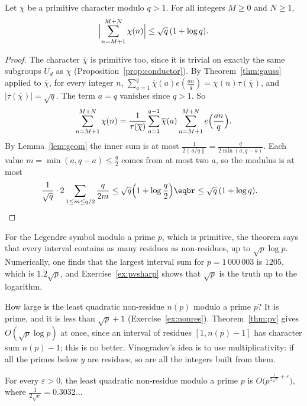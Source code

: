 \begin{theorem}\label{thm:pv}
Let $\chi$ be a primitive character modulo $q>1$. For all integers $M\ge0$ and $N\ge1$,
\[
\Bigl|\sum_{n=M+1}^{M+N}\chi(n)\Bigr|\le\sqrt q\,(1+\log q).
\]
\end{theorem}

\begin{proof}
The character $\overline\chi$ is primitive too, since it is trivial on exactly the same subgroups $U_d$ as $\chi$ (Proposition~\ref{prop:conductor}). By Theorem~\ref{thm:gauss} applied to $\overline\chi$, for every integer $n$,
$\sum_{a=1}^q\overline\chi(a)e(\frac{an}q)=\chi(n)\tau(\overline\chi)$, and $|\tau(\overline\chi)|=\sqrt q$. The term $a=q$ vanishes since $q>1$. So
\[
\sum_{n=M+1}^{M+N}\chi(n)=\frac1{\tau(\overline\chi)}\sum_{a=1}^{q-1}\overline\chi(a)\sum_{n=M+1}^{M+N}e\Bigl(\frac{an}q\Bigr).
\]
By Lemma~\ref{lem:geom} the inner sum is at most $\frac1{2\|a/q\|}=\frac q{2\min(a,q-a)}$. Each value $m=\min(a,q-a)\le\frac q2$ comes from at most two $a$, so the modulus is at most
\[
\begin{aligned}\frac1{\sqrt q}\cdot2\sum_{1\le m\le q/2}\frac q{2m}&\le\sqrt q\Bigl(1+\log\frac q2\Bigr)\eqbr\le\sqrt q\,(1+\log q).\end{aligned}
\]
\end{proof}

For the Legendre symbol modulo a prime $p$, which is primitive, the theorem says that every interval contains as many residues as non-residues, up to $\sqrt p\log p$. Numerically, one finds that the largest interval sum
for $p=1\,000\,003$ is $1205$, which is $1.2\sqrt p$, and Exercise~\ref{ex:pvsharp} shows that $\sqrt p$ is the truth up to the logarithm.

How large is the least quadratic non-residue $n(p)$ modulo a prime $p$? It is prime, and it is less than $\sqrt p+1$ (Exercise~\ref{ex:nonres}). Theorem~\ref{thm:pv} gives $O(\sqrt p\log p)$ at once, since an interval of
residues $[1,n(p)-1]$ has character sum $n(p)-1$; this is no better. Vinogradov's idea is to use multiplicativity: if all the primes below $y$ are residues, so are all the integers built from them.

\begin{theorem}[Vinogradov, 1918]\label{thm:vinogradov}
For every $\varepsilon>0$, the least quadratic non-residue modulo a prime $p$ is $O\bigl(p^{\frac1{2\sqrt e}+\varepsilon}\bigr)$, where $\frac1{2\sqrt e}=0.3032\ldots$
\end{theorem}

